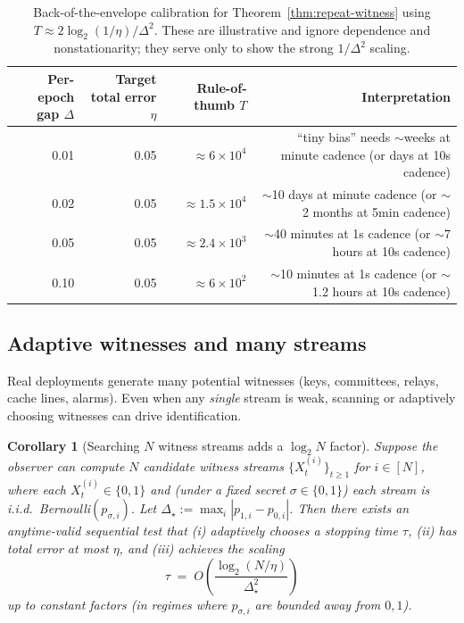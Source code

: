 \documentclass[11pt]{article}
\newtheorem{corollary}{Corollary}
\begin{document}
\begin{table}[h]
\centering
\begin{tabular}{@{}rrrr@{}}
\toprule
Per-epoch gap $\Delta$ & Target total error $\eta$ & Rule-of-thumb $T$ & Interpretation \\
\midrule
0.01 & 0.05 & $\approx 6\times 10^4$ & ``tiny bias'' needs $\sim$weeks at minute cadence (or days at 10s cadence) \\
0.02 & 0.05 & $\approx 1.5\times 10^4$ & $\sim$10 days at minute cadence (or $\sim$2 months at 5min cadence) \\
0.05 & 0.05 & $\approx 2.4\times 10^3$ & $\sim$40 minutes at 1s cadence (or $\sim$7 hours at 10s cadence) \\
0.10 & 0.05 & $\approx 6\times 10^2$ & $\sim$10 minutes at 1s cadence (or $\sim$1.2 hours at 10s cadence) \\
\bottomrule
\end{tabular}
\caption{Back-of-the-envelope calibration for Theorem~\ref{thm:repeat-witness} using $T\approx 2\log_2(1/\eta)/\Delta^2$.
These are illustrative and ignore dependence and nonstationarity; they serve only to show the strong $1/\Delta^2$ scaling.
}
\label{tab:calibration}
\end{table}


\subsection{Adaptive witnesses and many streams}
Real deployments generate many potential witnesses (keys, committees, relays, cache lines, alarms).
Even when any \emph{single} stream is weak, scanning or adaptively choosing witnesses can drive identification.

\begin{corollary}[Searching $N$ witness streams adds a $\log_2 N$ factor]
\label{cor:many-witness-search}
Suppose the observer can compute $N$ candidate witness streams
$\{X^{(i)}_t\}_{t\ge 1}$ for $i\in[N]$, where each $X^{(i)}_t\in\{0,1\}$ and (under a fixed secret $\sigma\in\{0,1\}$) each stream is i.i.d.\ Bernoulli$(p_{\sigma,i})$.
Let $\Delta_\star := \max_i |p_{1,i}-p_{0,i}|$.
Then there exists an anytime-valid sequential test that (i) adaptively chooses a stopping time $\tau$,
(ii) has total error at most $\eta$, and (iii) achieves the scaling
\[
\tau \;=\; O\!\left(\frac{\log_2(N/\eta)}{\Delta_\star^2}\right)
\]
up to constant factors (in regimes where $p_{\sigma,i}$ are bounded away from $0,1$).
\end{corollary}
\end{document}
